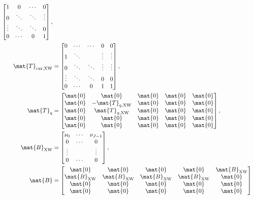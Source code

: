 \documentclass{jpmarticle}
\let\subequationsorig\subequations%
\let\endsubequationsorig\endsubequations%
\renewenvironment{subequations}{
  \subequationsorig
  \renewcommand{\theequation}{\theparentequation.\arabic{equation}}
}{
  \endsubequationsorig
}
\begin{document}
\begin{subequations}
\begin{align}
\begin{bmatrix}
      1 & 0 & \cdots & 0
      \\
      0 & \ddots & \ddots & \vdots
      \\
      \vdots & \ddots & \ddots & 0
      \\
      0 & \cdots & 0 & 1
    \end{bmatrix},
    \\
    \mat{T}_{\mathrm{cur}, \mathrm{XW}} &=
    \begin{bmatrix}
      0 & \cdots & \cdots & 0 & 0
      \\
      1 & \ddots & & \vdots & \vdots
      \\
      0 & \ddots & \ddots & \vdots & \vdots
      \\
      \vdots & \ddots & \ddots & 0 & 0
      \\
      0 & \cdots & 0 & 1 & 1
    \end{bmatrix},
    \\
    \mat{T}_q &=
    \begin{bmatrix}
      \mat{0} & \mat{0} & \mat{0} & \mat{0} & \mat{0}
      \\
      \mat{0} & - \mat{T}_{q, \mathrm{XW}} & \mat{0} & \mat{0} & \mat{0}
      \\
      \mat{0} & \mat{T}_{q, \mathrm{XW}} & \mat{0} & \mat{0} & \mat{0}
      \\
      \mat{0} & \mat{0} & \mat{0} & \mat{0} & \mat{0}
      \\
      \mat{0} & \mat{0} & \mat{0} & \mat{0} & \mat{0}
    \end{bmatrix},
    \\
    \mat{B}_{\mathrm{XW}} &=
    \begin{bmatrix}
      \nu_0 & \cdots & \nu_{J - 1} \\
      0 & \cdots & 0 \\
      \vdots & & \vdots \\
      0 & \cdots & 0
    \end{bmatrix},
    \\
    \mat{B} &=
    \begin{bmatrix}
      \mat{0} & \mat{0} & \mat{0} & \mat{0} & \mat{B}_{\mathrm{XW}}
      \\
      \mat{B}_{\mathrm{XW}} & \mat{B}_{\mathrm{XW}} & \mat{B}_{\mathrm{XW}}
      & \mat{B}_{\mathrm{XW}} & \mat{0}
      \\
      \mat{0} & \mat{0} & \mat{0} & \mat{0} & \mat{0}
      \\
      \mat{0} & \mat{0} & \mat{0} & \mat{0} & \mat{0}
      \\

\end{bmatrix}
\end{align}
\end{subequations}
\end{document}
